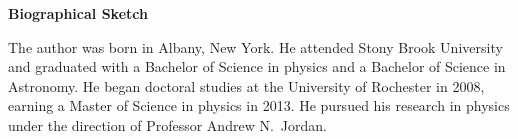 \clearpage
\thispagestyle{empty}
\begin{center}
  \textbf{Biographical Sketch}
\end{center}

The author was born in Albany, New York.  He attended Stony Brook University and graduated with a Bachelor of Science in physics and a Bachelor of Science in Astronomy.  He began doctoral studies at the University of Rochester in 2008, earning a Master of Science in physics in 2013.  He pursued his research in physics under the direction of Professor Andrew N.~Jordan.


